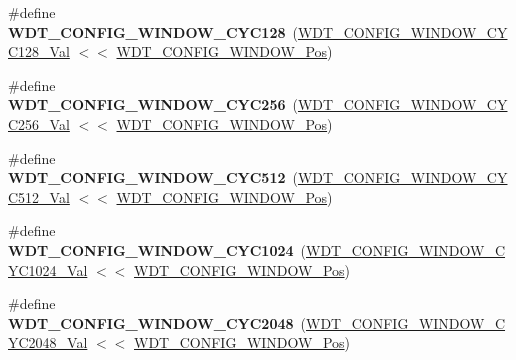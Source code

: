 \begin{DoxyCompactItemize}
\item 
\hypertarget{group___s_a_m_l21___w_d_t_ga04f111e560ea7df535897e487ecae1cc}{}\#define {\bfseries W\+D\+T\+\_\+\+C\+O\+N\+F\+I\+G\+\_\+\+W\+I\+N\+D\+O\+W\+\_\+\+C\+Y\+C128}~(\hyperlink{group___s_a_m_l21___w_d_t_gad416dcc6288734247575eaddfe656d7c}{W\+D\+T\+\_\+\+C\+O\+N\+F\+I\+G\+\_\+\+W\+I\+N\+D\+O\+W\+\_\+\+C\+Y\+C128\+\_\+\+Val}  $<$$<$ \hyperlink{group___s_a_m_l21___w_d_t_gab2d3263bd9ad06e3257234d9da623ef8}{W\+D\+T\+\_\+\+C\+O\+N\+F\+I\+G\+\_\+\+W\+I\+N\+D\+O\+W\+\_\+\+Pos})\label{group___s_a_m_l21___w_d_t_ga04f111e560ea7df535897e487ecae1cc}

\item 
\hypertarget{group___s_a_m_l21___w_d_t_ga9d585d597938b7a84f20f80cd7dd34dd}{}\#define {\bfseries W\+D\+T\+\_\+\+C\+O\+N\+F\+I\+G\+\_\+\+W\+I\+N\+D\+O\+W\+\_\+\+C\+Y\+C256}~(\hyperlink{group___s_a_m_l21___w_d_t_gae8ffa2201aa9c9f31e20c942b3a5cfc9}{W\+D\+T\+\_\+\+C\+O\+N\+F\+I\+G\+\_\+\+W\+I\+N\+D\+O\+W\+\_\+\+C\+Y\+C256\+\_\+\+Val}  $<$$<$ \hyperlink{group___s_a_m_l21___w_d_t_gab2d3263bd9ad06e3257234d9da623ef8}{W\+D\+T\+\_\+\+C\+O\+N\+F\+I\+G\+\_\+\+W\+I\+N\+D\+O\+W\+\_\+\+Pos})\label{group___s_a_m_l21___w_d_t_ga9d585d597938b7a84f20f80cd7dd34dd}

\item 
\hypertarget{group___s_a_m_l21___w_d_t_ga55bae6a44273f74f1c5853e8137f208f}{}\#define {\bfseries W\+D\+T\+\_\+\+C\+O\+N\+F\+I\+G\+\_\+\+W\+I\+N\+D\+O\+W\+\_\+\+C\+Y\+C512}~(\hyperlink{group___s_a_m_l21___w_d_t_ga6df0e2a9ac9053130ab8673ec4801264}{W\+D\+T\+\_\+\+C\+O\+N\+F\+I\+G\+\_\+\+W\+I\+N\+D\+O\+W\+\_\+\+C\+Y\+C512\+\_\+\+Val}  $<$$<$ \hyperlink{group___s_a_m_l21___w_d_t_gab2d3263bd9ad06e3257234d9da623ef8}{W\+D\+T\+\_\+\+C\+O\+N\+F\+I\+G\+\_\+\+W\+I\+N\+D\+O\+W\+\_\+\+Pos})\label{group___s_a_m_l21___w_d_t_ga55bae6a44273f74f1c5853e8137f208f}

\item 
\hypertarget{group___s_a_m_l21___w_d_t_gaa1cadc516c621b34c54e1107d7a3b265}{}\#define {\bfseries W\+D\+T\+\_\+\+C\+O\+N\+F\+I\+G\+\_\+\+W\+I\+N\+D\+O\+W\+\_\+\+C\+Y\+C1024}~(\hyperlink{group___s_a_m_l21___w_d_t_ga24922404455be3a1c28d404d7428e97b}{W\+D\+T\+\_\+\+C\+O\+N\+F\+I\+G\+\_\+\+W\+I\+N\+D\+O\+W\+\_\+\+C\+Y\+C1024\+\_\+\+Val} $<$$<$ \hyperlink{group___s_a_m_l21___w_d_t_gab2d3263bd9ad06e3257234d9da623ef8}{W\+D\+T\+\_\+\+C\+O\+N\+F\+I\+G\+\_\+\+W\+I\+N\+D\+O\+W\+\_\+\+Pos})\label{group___s_a_m_l21___w_d_t_gaa1cadc516c621b34c54e1107d7a3b265}

\item 
\hypertarget{group___s_a_m_l21___w_d_t_gac5a4fd460ff6229e81831621453a06fb}{}\#define {\bfseries W\+D\+T\+\_\+\+C\+O\+N\+F\+I\+G\+\_\+\+W\+I\+N\+D\+O\+W\+\_\+\+C\+Y\+C2048}~(\hyperlink{group___s_a_m_l21___w_d_t_ga93691d3f0e1d8e71d7bd5aea7ac72a08}{W\+D\+T\+\_\+\+C\+O\+N\+F\+I\+G\+\_\+\+W\+I\+N\+D\+O\+W\+\_\+\+C\+Y\+C2048\+\_\+\+Val} $<$$<$ \hyperlink{group___s_a_m_l21___w_d_t_gab2d3263bd9ad06e3257234d9da623ef8}{W\+D\+T\+\_\+\+C\+O\+N\+F\+I\+G\+\_\+\+W\+I\+N\+D\+O\+W\+\_\+\+Pos})\label{group___s_a_m_l21___w_d_t_gac5a4fd460ff6229e81831621453a06fb}


\end{DoxyCompactItemize}
